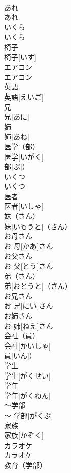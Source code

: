 \documentclass[8pt]{extreport}
\begin{document}
\begin{CJK}{UTF8}{min}
\\	あれ	
\\	あれ		
\\	いくら	
\\	いくら		
\\	椅子	
\\	椅子[いす]		
\\	エアコン	
\\	エアコン		
\\	英語	
\\	英語[えいご]		
\\	兄	
\\	兄[あに]		
\\	姉	
\\	姉[あね]		
\\	医学（部）	
\\	医学[いがく]
\\	部[ぶ]）		
\\	いくつ	
\\	いくつ		
\\	医者	
\\	医者[いしゃ]		
\\	妹（さん）	
\\	妹[いもうと]（さん）		
\\	お母さん	
\\	お 母[かあ]さん		
\\	お父さん	
\\	お 父[とう]さん		
\\	弟（さん）	
\\	弟[おとうと]（さん）		
\\	お兄さん	
\\	お 兄[にい]さん		
\\	お姉さん	
\\	お 姉[ねえ]さん		
\\	会社（員）	
\\	会社[かいしゃ]
\\	員[いん]）		
\\	学生	
\\	学生[がくせい]		
\\	学年	
\\	学年[がくねん]		
\\	〜学部	
\\	〜 学部[がくぶ]		
\\	家族	
\\	家族[かぞく]		
\\	カラオケ	
\\	カラオケ		
\\	教育（学部）	

\end{CJK}
\end{document}
